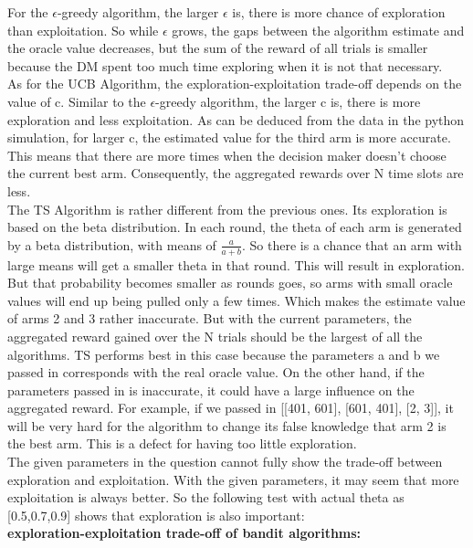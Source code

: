 \documentclass{article}
\begin{document}
\begin{homeworkProblem}
\begin{enumerate}
        For the $\epsilon$-greedy algorithm, the larger $\epsilon$ is, there is more chance of exploration than exploitation.
        So while $\epsilon$ grows, the gaps between the algorithm estimate and the oracle value decreases, but the sum of the reward of all trials is smaller because the DM spent too much time exploring when it is not that necessary.\\
        As for the UCB Algorithm, the exploration-exploitation trade-off depends on the value of c.
        Similar to the $\epsilon$-greedy algorithm, the larger c is, there is more exploration and less exploitation.
        As can be deduced from the data in the python simulation, for larger c, the estimated value for the third arm is more accurate.
        This means that there are more times when the decision maker doesn't choose the current best arm. Consequently, the aggregated rewards over N time slots are less.\\
        The TS Algorithm is rather different from the previous ones. Its exploration is based on the beta distribution. 
        In each round, the theta of each arm is generated by a beta distribution, with means of $\frac{a}{a+b}$. So there is a chance that an arm with large means will get a smaller theta in that round. This will result in exploration.
        But that probability becomes smaller as rounds goes, so arms with small oracle values will end up being pulled only a few times.
        Which makes the estimate value of arms 2 and 3 rather inaccurate. But with the current parameters, the aggregated reward gained over the N trials should be the largest of all the algorithms. 
        TS performs best in this case because the parameters a and b we passed in corresponds with the real oracle value. On the other hand, 
        if the parameters passed in is inaccurate, it could have a large influence on the aggregated reward. For example, if we passed in [[401, 601], [601, 401], [2, 3]], it will be very hard for the algorithm to change its false knowledge that arm 2 is the best arm. This is a defect for having too little exploration.\\
        The given parameters in the question cannot fully show the trade-off between exploration and exploitation. With the given parameters, it may seem that more exploitation is always better. So the following test with actual theta as [0.5,0.7,0.9] shows that exploration is also important:\\
        \textbf{exploration-exploitation trade-off of bandit algorithms:}\\

\end{enumerate}
\end{homeworkProblem}
\end{document}
